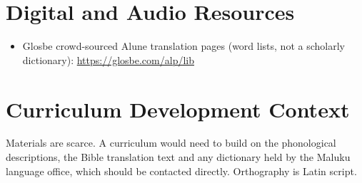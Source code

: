 \documentclass[12pt]{article}
\begin{document}
\section{Digital and Audio Resources}
\begin{itemize}
\item Glosbe crowd-sourced Alune translation pages (word lists, not a scholarly dictionary): \url{https://glosbe.com/alp/lib}
\end{itemize}

\section{Curriculum Development Context}
Materials are scarce. A curriculum would need to build on the phonological descriptions, the Bible translation text and any dictionary held by the Maluku language office, which should be contacted directly. Orthography is Latin script.
\end{document}
